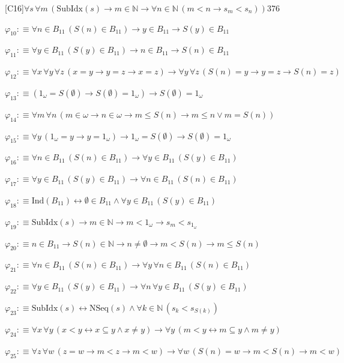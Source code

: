 \begin{fullproof}{[C16]}{$\forall s\,\forall m\,(\mathrm{SubIdx}(s) \to m \in \mathbb{N} \to \forall n \in \mathbb{N}\,(m < n \to s_{m} < s_{n}))$}{376}
\begin{abbrevlist}
\item $\varphi_{10} :\equiv \forall n \in B_{11}\,(S(n) \in B_{11}) \to y \in B_{11} \to S(y) \in B_{11}$
\item $\varphi_{11} :\equiv \forall y \in B_{11}\,(S(y) \in B_{11}) \to n \in B_{11} \to S(n) \in B_{11}$
\item $\varphi_{12} :\equiv \forall x\,\forall y\,\forall z\,(x = y \to y = z \to x = z) \to \forall y\,\forall z\,(S(n) = y \to y = z \to S(n) = z)$
\item $\varphi_{13} :\equiv (1_{\omega} = S(\emptyset) \to S(\emptyset) = 1_{\omega}) \to S(\emptyset) = 1_{\omega}$
\item $\varphi_{14} :\equiv \forall m\,\forall n\,(m \in \omega \to n \in \omega \to m \leq S(n) \to m \leq n \lor m = S(n))$
\item $\varphi_{15} :\equiv \forall y\,(1_{\omega} = y \to y = 1_{\omega}) \to 1_{\omega} = S(\emptyset) \to S(\emptyset) = 1_{\omega}$
\item $\varphi_{16} :\equiv \forall n \in B_{11}\,(S(n) \in B_{11}) \to \forall y \in B_{11}\,(S(y) \in B_{11})$
\item $\varphi_{17} :\equiv \forall y \in B_{11}\,(S(y) \in B_{11}) \to \forall n \in B_{11}\,(S(n) \in B_{11})$
\item $\varphi_{18} :\equiv \mathrm{Ind}(B_{11}) \leftrightarrow \emptyset \in B_{11} \land \forall y \in B_{11}\,(S(y) \in B_{11})$
\item $\varphi_{19} :\equiv \mathrm{SubIdx}(s) \to m \in \mathbb{N} \to m < 1_{\omega} \to s_{m} < s_{1_{\omega}}$
\item $\varphi_{20} :\equiv n \in B_{11} \to S(n) \in \mathbb{N} \to n \neq \emptyset \to m < S(n) \to m \leq S(n)$
\item $\varphi_{21} :\equiv \forall n \in B_{11}\,(S(n) \in B_{11}) \to \forall y\,\forall n \in B_{11}\,(S(n) \in B_{11})$
\item $\varphi_{22} :\equiv \forall y \in B_{11}\,(S(y) \in B_{11}) \to \forall n\,\forall y \in B_{11}\,(S(y) \in B_{11})$
\item $\varphi_{23} :\equiv \mathrm{SubIdx}(s) \leftrightarrow \mathrm{NSeq}(s) \land \forall k \in \mathbb{N}\,(s_{k} < s_{S(k)})$
\item $\varphi_{24} :\equiv \forall x\,\forall y\,(x < y \leftrightarrow x \subseteq y \land x \neq y) \to \forall y\,(m < y \leftrightarrow m \subseteq y \land m \neq y)$
\item $\varphi_{25} :\equiv \forall z\,\forall w\,(z = w \to m < z \to m < w) \to \forall w\,(S(n) = w \to m < S(n) \to m < w)$

\end{abbrevlist}
\end{fullproof}
